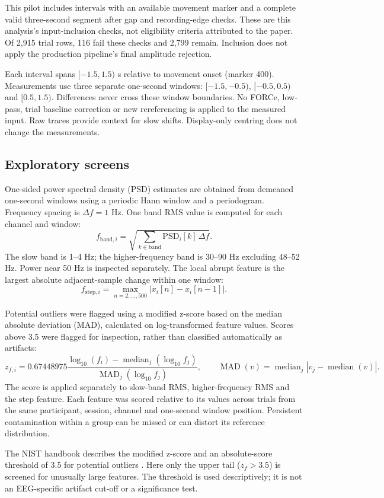 \documentclass[11pt,a4paper]{article}
\begin{document}
This pilot includes intervals with an available movement marker and a complete valid three-second segment after gap and recording-edge checks. These are this analysis's input-inclusion checks, not eligibility criteria attributed to the paper. Of 2,915 trial rows, 116 fail these checks and 2,799 remain. Inclusion does not apply the production pipeline's final amplitude rejection.

Each interval spans $[-1.5,1.5)$ s relative to movement onset (marker 400). Measurements use three separate one-second windows: $[-1.5,-0.5)$, $[-0.5,0.5)$ and $[0.5,1.5)$. Differences never cross these window boundaries. No FORCe, low-pass, trial baseline correction or new rereferencing is applied to the measured input. Raw traces provide context for slow shifts. Display-only centring does not change the measurements.
\subsection{Exploratory screens}
One-sided power spectral density (PSD) estimates are obtained from demeaned one-second windows using a periodic Hann window and a periodogram. Frequency spacing is $\Delta f=1$ Hz. One band RMS value is computed for each channel and window:
\[
f_{\mathrm{band},i}=\sqrt{\sum_{k\in\mathrm{band}}\mathrm{PSD}_i[k]\,\Delta f}.
\]
The slow band is 1--4 Hz; the higher-frequency band is 30--90 Hz excluding 48--52 Hz. Power near 50 Hz is inspected separately. The local abrupt feature is the largest absolute adjacent-sample change within one window:
\[
f_{\mathrm{step},i}=\max_{n=2,\ldots,500}|x_i[n]-x_i[n-1]|.
\]

Potential outliers were flagged using a modified z-score based on the median absolute deviation (MAD), calculated on log-transformed feature values. Scores above 3.5 were flagged for inspection, rather than classified automatically as artifacts:
\[
z_{f,i}=0.67448975\frac{\log_{10}(f_i)-\operatorname{median}_j(\log_{10}f_j)}{\operatorname{MAD}_j(\log_{10}f_j)},\qquad
\operatorname{MAD}(v)=\operatorname{median}_j|v_j-\operatorname{median}(v)|.
\]
The score is applied separately to slow-band RMS, higher-frequency RMS and the step feature. Each feature was scored relative to its values across trials from the same participant, session, channel and one-second window position. Persistent contamination within a group can be missed or can distort its reference distribution.

The NIST handbook describes the modified z-score and an absolute-score threshold of 3.5 for potential outliers \cite{nist}. Here only the upper tail ($z_f>3.5$) is screened for unusually large features. The threshold is used descriptively; it is not an EEG-specific artifact cut-off or a significance test.
\end{document}
